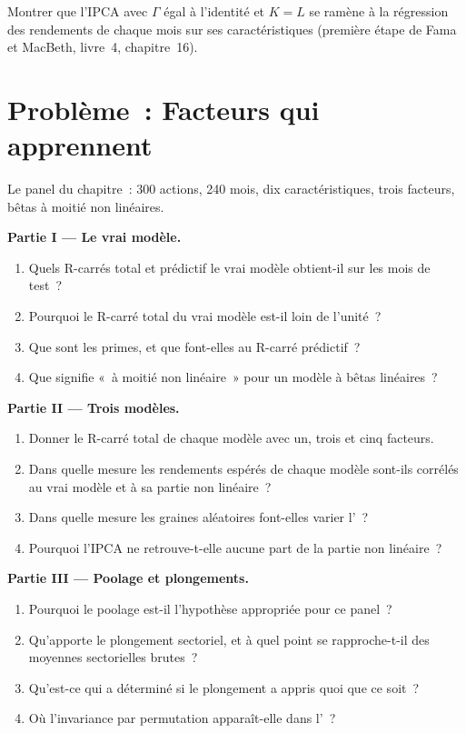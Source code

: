 \begin{exercise}[$\star\star\star$]\label{exo:ml:cross-sectional-deep-models:8}
Montrer que l'IPCA avec $\Gamma$ égal à l'identité et $K = L$ se ramène à la régression des rendements de chaque mois sur ses
caractéristiques (première étape de Fama et MacBeth, livre~4, chapitre~16).
\end{exercise}

\section{Problème~: Facteurs qui apprennent}

\begin{problem}\label{pb:ml:cross-sectional-deep-models:1}
Le panel du chapitre~: 300 actions, 240 mois, dix caractéristiques, trois facteurs, bêtas à moitié non linéaires.

\medskip\noindent\textbf{Partie I --- Le vrai modèle.}
\begin{enumerate}
\item Quels R-carrés total et prédictif le vrai modèle obtient-il sur les mois de test~?
\item Pourquoi le R-carré total du vrai modèle est-il loin de l'unité~?
\item Que sont les primes, et que font-elles au R-carré prédictif~?
\item Que signifie «~à moitié non linéaire~» pour un modèle à bêtas linéaires~?
\end{enumerate}

\medskip\noindent\textbf{Partie II --- Trois modèles.}
\begin{enumerate}[resume]
\item Donner le R-carré total de chaque modèle avec un, trois et cinq facteurs.
\item Dans quelle mesure les rendements espérés de chaque modèle sont-ils corrélés au vrai modèle et à sa partie non linéaire~?
\item Dans quelle mesure les graines aléatoires font-elles varier l'~?
\item Pourquoi l'IPCA ne retrouve-t-elle aucune part de la partie non linéaire~?
\end{enumerate}

\medskip\noindent\textbf{Partie III --- Poolage et plongements.}
\begin{enumerate}[resume]
\item Pourquoi le poolage est-il l'hypothèse appropriée pour ce panel~?
\item Qu'apporte le plongement sectoriel, et à quel point se rapproche-t-il des moyennes sectorielles brutes~?
\item Qu'est-ce qui a déterminé si le plongement a appris quoi que ce soit~?
\item Où l'invariance par permutation apparaît-elle dans l'~?
\end{enumerate}


\end{problem}
